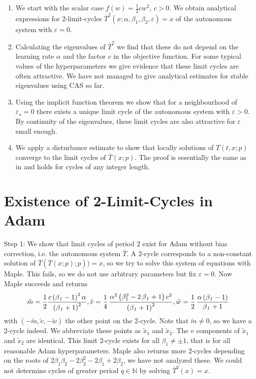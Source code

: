 \documentclass[runningheads]{llncs}
\def\weight{w}
\def\mN{{\mathbb{N}}}
\begin{document}
\begin{enumerate}
\item
We start with the scalar case $f(\weight) = \frac 1 2 c \weight^2$, $c>0$.
We obtain analytical expressions for 2-limit-cycles 
$\bar T^2(x; \alpha, \beta_1, \beta_2, \varepsilon) = x$ 
of the autonomous system with $\varepsilon=0$. %
\item
Calculating the eigenvalues of $\bar T^2$ we find that these do not depend on the 
learning rate $\alpha$ and the factor $c$ in the objective function.
For some typical values of the 
hyperparameters we give evidence that these limit cycles are often attractive. 
We have not managed to give analytical estimates for stable eigenvalues using CAS so far.
\item
Using the implicit function theorem we show that for a neighbourhood
of $\varepsilon_\star=0$ there exists a unique limit cycle of the autonomous system with $\varepsilon>0$.
By continuity of the eigenvalues, these limit cycles are also attractive for $\varepsilon$ small enough. 
\item 
We apply a disturbance estimate to show that locally solutions of $T(t, x; p)$  converge to
the limit cycles of $\bar T(x; p)$. The proof is essentially the same as in \cite[Theorem V.1.]{BockWeiss.2019} and holds for cycles of any integer length.
\end{enumerate}

\section{Existence of 2-Limit-Cycles in Adam}

Step 1: We show that limit cycles of period 2 exist for Adam without bias correction, 
i.e. the autonomous system $\bar T$. A 2-cycle corresponds to a non-constant solution of
$\bar T(\bar T(x;p);p))=x$, so we try to solve this system of equations with Maple. This 
fails, so we do not use arbitrary parameters but fix $\varepsilon=0$. Now Maple succeeds
and returns
\begin{equation}
\label{eq:wtildeExplizit}
  \tilde m=\frac 1 2 {\frac {c \left( {\it \beta_1}-1 \right) ^{2}\alpha}{ \left( {
\it \beta_1}+1 \right) ^{2}}},
\tilde v=\frac 1 4\,{\frac {{\alpha}^{2} \left( \beta_1^{2}-
2\,{\it \beta_1}+1 \right) {c}^{2}}{ \left( {\it \beta_1}+1 \right) ^{2}}},
\tilde \weight=\frac 1 2
\,{\frac {\alpha \left( {\it \beta_1}-1 \right) }{{\it \beta_1}+1}} 
\end{equation}
with $(-\tilde m, \tilde v, -\tilde \weight)$ the other point on the 2-cycle. 
Note that $\tilde m\neq 0$, so we have a 2-cycle indeed. 
We abbreviate these points as $\tilde x_1$ and $\tilde x_2$.
The $v$ components of $\tilde x_1$ and $\tilde x_2$ are identical.
This limit 2-cycle exists for all $\beta_1\neq \pm 1$, that is for all reasonable Adam hyperparameters. Maple also returns more 2-cycles depending on the
roots of $2\beta_1\beta_2-2\beta_2^2-2\beta_1+2\beta_2$, we have not analyzed these. %
We could not determine cycles of greater period $q\in \mN$ by solving $\bar T^q(x)=x$.
\end{document}

